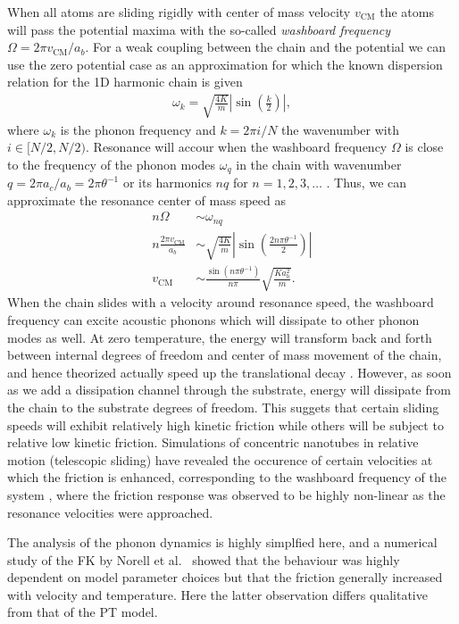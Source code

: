 When all atoms are sliding rigidly with center of mass velocity $v_{{\text{CM}}}$ the atoms will pass the potential maxima with the so-called \textit{washboard frequency} $\Omega = 2\pi v_{{\text{CM}}} / a_b$. For a weak coupling between the chain and the potential we can use the zero potential case as an approximation for which the known dispersion relation for the 1D harmonic chain is given \cite[p. 92]{Kittel2004}
\begin{align*}
  \omega_k = \sqrt{\frac{4 K}{m}} \left|\sin{\left(\frac{k}{2}\right)}\right|,
\end{align*}
where $\omega_k$ is the phonon frequency and $k = 2\pi i / N$ the wavenumber with $i\in [N/2, N/2)$. Resonance will accour when the washboard frequency $\Omega$ is close to the frequency of the phonon modes $\omega_q$ in the chain with wavenumber $q = 2\pi a_c / a_b = 2\pi \theta^{-1}$ or its harmonics $nq$ for $n = 1, 2, 3, \hdots$ \cite{van_den_Ende_2012}. Thus, we can approximate the resonance center of mass speed as
\begin{align*}
    n \Omega &\sim \omega_{nq} \\
    n \frac{2\pi v_{\text{CM}}}{a_b} &\sim \sqrt{\frac{4K}{m}} \left| \sin{\left(\frac{2n \pi \theta^{-1}}{2}\right)}\right| \\
    v_{\text{CM}} &\sim \frac{\sin{(n\pi \theta^{-1})}}{n \pi} \sqrt{\frac{Ka_b^2}{m}}.
\end{align*}
When the chain slides with a velocity around resonance speed, the washboard
frequency can excite acoustic phonons which will dissipate to other phonon modes
as well. At zero temperature, the energy will transform back and forth between
internal degrees of freedom and center of mass movement of the chain, and hence theorized actually speed up the translational decay \cite{FK2D}. However, as soon as we add a dissipation channel through the substrate, energy will dissipate from the chain to the substrate degrees of freedom. This suggets that certain sliding speeds will exhibit relatively high kinetic friction while
others will be subject to relative low kinetic friction. Simulations of
concentric nanotubes in relative motion (telescopic sliding) have revealed the
occurence of certain velocities at which the friction is enhanced, corresponding
to the washboard frequency of the system \cite{Manini_2016}, where the friction
response was observed to be highly non-linear as the resonance velocities were
approached. 

The analysis of the phonon dynamics is highly simplfied here, and a numerical study of the \acrshort{FK} by Norell et al.\ \cite{FK2D} showed that the behaviour was highly dependent on model parameter choices but that the friction generally increased with velocity and temperature. Here the latter observation differs qualitative from that of the \acrshort{PT} model.



